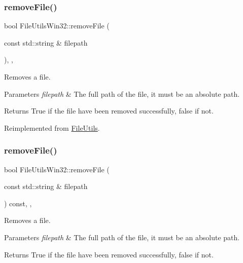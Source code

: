 \subsubsection{\texorpdfstring{remove\+File()}{removeFile()}\hspace{0.1cm}{\footnotesize\ttfamily [1/2]}}
{\footnotesize\ttfamily bool File\+Utils\+Win32\+::remove\+File (\begin{DoxyParamCaption}\item[{const std\+::string \&}]{filepath }\end{DoxyParamCaption})\hspace{0.3cm}{\ttfamily [override]}, {\ttfamily [protected]}, {\ttfamily [virtual]}}

Removes a file.


\begin{DoxyParams}{Parameters}
{\em filepath} & The full path of the file, it must be an absolute path. \\
\hline
\end{DoxyParams}
\begin{DoxyReturn}{Returns}
True if the file have been removed successfully, false if not. 
\end{DoxyReturn}


Reimplemented from \hyperlink{classFileUtils_aee725bf84f7bc707f9a94543d75b70fb}{File\+Utils}.

\mbox{\label{classFileUtilsWin32_a45bb3aa3aff99f5d4367d048f722beaa}} 
\subsubsection{\texorpdfstring{remove\+File()}{removeFile()}\hspace{0.1cm}{\footnotesize\ttfamily [2/2]}}
{\footnotesize\ttfamily bool File\+Utils\+Win32\+::remove\+File (\begin{DoxyParamCaption}\item[{const std\+::string \&}]{filepath }\end{DoxyParamCaption}) const\hspace{0.3cm}{\ttfamily [override]}, {\ttfamily [protected]}, {\ttfamily [virtual]}}

Removes a file.


\begin{DoxyParams}{Parameters}
{\em filepath} & The full path of the file, it must be an absolute path. \\
\hline
\end{DoxyParams}
\begin{DoxyReturn}{Returns}
True if the file have been removed successfully, false if not. 
\end{DoxyReturn}


